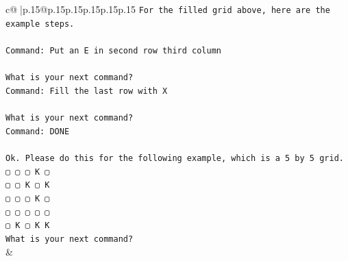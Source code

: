 \documentclass{article}
\begin{document}
{\begin{supertabular}{c@{$\;$}|p{.15\linewidth}@{}p{.15\linewidth}p{.15\linewidth}p{.15\linewidth}p{.15\linewidth}p{.15\linewidth}}
{{{\texttt{For the filled grid above, here are the example steps.} \\
\\ 
\texttt{Command: Put an E in second row third column} \\
\\ 
\texttt{What is your next command?} \\
\texttt{Command: Fill the last row with X} \\
\\ 
\texttt{What is your next command?} \\
\texttt{Command: DONE} \\
\\ 
\texttt{Ok. Please do this for the following example, which is a 5 by 5 grid.} \\
\texttt{▢ ▢ ▢ K ▢} \\
\texttt{▢ ▢ K ▢ K} \\
\texttt{▢ ▢ ▢ K ▢} \\
\texttt{▢ ▢ ▢ ▢ ▢} \\
\texttt{▢ K ▢ K K} \\
\texttt{What is your next command?} \\
            }
        }
    }
    & \\ \\


\end{supertabular}}
\end{document}
